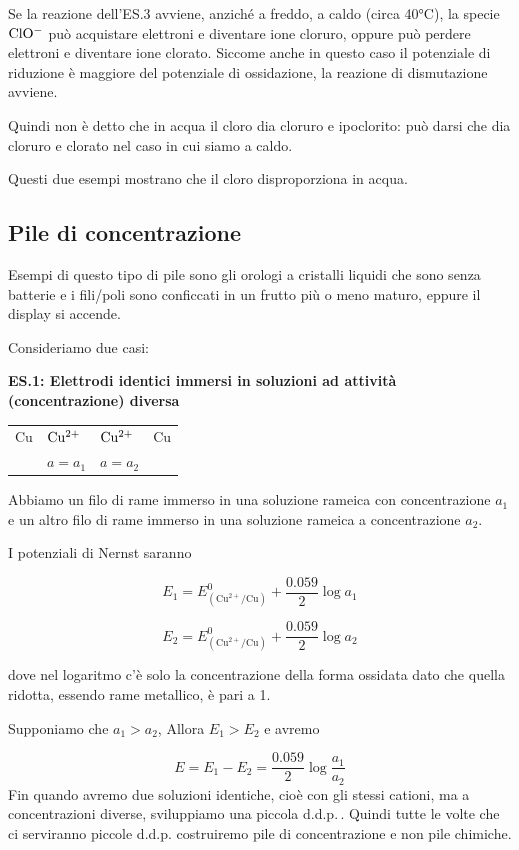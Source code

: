 Se la reazione dell'ES.3 avviene, anziché a freddo, a caldo (circa 40°C), la specie $\rm ClO^-$ può acquistare elettroni e diventare ione cloruro, oppure può perdere elettroni e diventare ione clorato. Siccome anche in questo caso il potenziale di riduzione è maggiore del potenziale di ossidazione, la reazione di dismutazione avviene.

Quindi non è detto che in acqua il cloro dia cloruro e ipoclorito: può darsi che dia cloruro e clorato nel caso in cui siamo a caldo.

\vspace{0.2cm}Questi due esempi mostrano che il cloro disproporziona in acqua.

\subsection{Pile di concentrazione}
Esempi di questo tipo di pile sono gli orologi a cristalli liquidi che sono senza batterie e i fili/poli sono conficcati in un frutto più o meno maturo, eppure il display si accende.

Consideriamo due casi:

\vspace{0.2cm}\textbf{ES.1: Elettrodi identici immersi in soluzioni ad attività (concentrazione) diversa}
\begin{center}
    \begin{tabular}{p{0.6cm}|p{1.6cm}||p{1.6cm}|p{0.6cm}}
        Cu & $\rm Cu^{2+}$ & $\rm Cu^{2+}$ & Cu\\[0.5ex]
         & $a= a_1$ & $a=a_2$&\\[0.5ex]
    \end{tabular}
\end{center}

Abbiamo un filo di rame immerso in una soluzione rameica con concentrazione $a_1$ e un altro filo di rame immerso in una soluzione rameica a concentrazione $a_2$.

I potenziali di Nernst saranno

$$E_1 = E^0_{(\text{Cu}^{2+}/\text{Cu})} + \frac{0.059}{2}\log a_1 $$

$$E_2 = E^0_{(\text{Cu}^{2+}/\text{Cu})} + \frac{0.059}{2}\log a_2 $$

dove nel logaritmo c'è solo la concentrazione della forma ossidata dato che quella ridotta, essendo rame metallico, è pari a 1.

Supponiamo che $a_1 > a_2$, Allora $E_1 > E_2$ e avremo 

$$E=E_1 - E_2 = \frac{0.059}{2} \log \frac{a_1}{a_2}$$
Fin quando avremo due soluzioni identiche, cioè con gli stessi cationi, ma a concentrazioni diverse, sviluppiamo una piccola d.d.p.\,. Quindi tutte le volte che ci serviranno piccole d.d.p. costruiremo pile di concentrazione e non pile chimiche.

